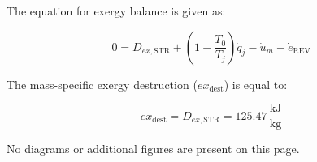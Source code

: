 The equation for exergy balance is given as:  

\[
0 = D_{ex,\text{STR}} + \left( 1 - \frac{T_0}{T_j} \right) \dot{q}_j - \dot{u}_m - \dot{e}_{\text{REV}}
\]

The mass-specific exergy destruction (\( ex_{\text{dest}} \)) is equal to:  

\[
ex_{\text{dest}} = D_{ex,\text{STR}} = 125.47 \, \frac{\text{kJ}}{\text{kg}}
\]  

No diagrams or additional figures are present on this page.